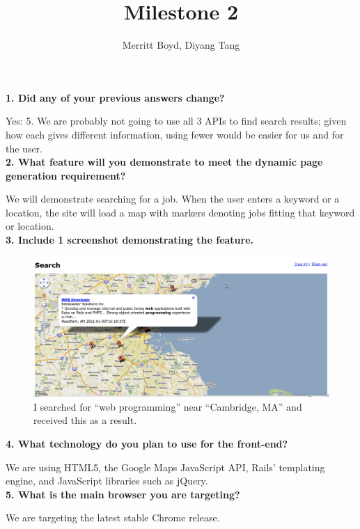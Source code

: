 \documentclass[12pt]{article}
\title{Milestone 2}
\author{Merritt Boyd, Diyang Tang}
\begin{document}
\maketitle

\noindent
\textbf{1. Did any of your previous answers change?}

Yes: 5.  We are probably not going to use all 3 APIs to find search results; given how each gives different information, using fewer would be easier for us and for the user. \\


\noindent
\textbf{2. What feature will you demonstrate to meet the dynamic page generation requirement?}

We will demonstrate searching for a job.  When the user enters a keyword or a location, the site will load a map with markers denoting jobs fitting that keyword or location. \\


\noindent
\textbf{3. Include 1 screenshot demonstrating the feature.}

\begin{figure}[h!]
\centering

\includegraphics[width=6in]{search.png}
\caption{I searched for ``web programming'' near ``Cambridge, MA'' and received this as a result.}
\end{figure} 

\noindent
\textbf{4. What technology do you plan to use for the front-end?}

We are using HTML5, the Google Maps JavaScript API, Rails' templating engine, and JavaScript libraries such as jQuery. \\

\noindent
\textbf{5. What is the main browser you are targeting?}

We are targeting the latest stable Chrome release. \\
\end{document}
